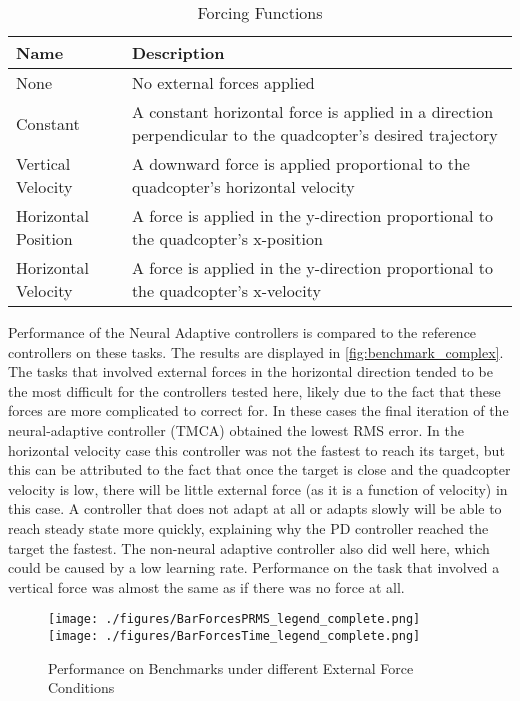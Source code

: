 \documentclass[letterpaper,12pt,titlepage,oneside,final]{book}
\begin{document}
\begin{table}
\caption{Forcing Functions} \label{table:forcingfunctions}
\begin{center}
\begin{tabular}{| l | p{9cm} |}
\hline
\textbf{Name} & \textbf{Description} \\ \hline
None & No external forces applied \\ \hline
Constant & A constant horizontal force is applied in a direction perpendicular to the quadcopter's desired trajectory\\ \hline
Vertical Velocity & A downward force is applied proportional to the quadcopter's horizontal velocity \\ \hline
Horizontal Position & A force is applied in the y-direction proportional to the quadcopter's x-position \\ \hline
Horizontal Velocity & A force is applied in the y-direction proportional to the quadcopter's x-velocity \\ \hline
\end{tabular}
\end{center}
\end{table}

Performance of the Neural Adaptive controllers is compared to the reference controllers on these tasks.
The results are displayed in \autoref{fig:benchmark_complex}.
The tasks that involved external forces in the horizontal direction tended to be the most difficult for the controllers tested here, likely due to the fact that these forces are more complicated to correct for.
In these cases the final iteration of the neural-adaptive controller (TMCA) obtained the lowest RMS error.
In the horizontal velocity case this controller was not the fastest to reach its target, but this can be attributed to the fact that once the target is close and the quadcopter velocity is low, there will be little external force (as it is a function of velocity) in this case. 
A controller that does not adapt at all or adapts slowly will be able to reach steady state more quickly, explaining why the PD controller reached the target the fastest.
The non-neural adaptive controller also did well here, which could be caused by a low learning rate.
Performance on the task that involved a vertical force was almost the same as if there was no force at all. 

\begin{figure}
\centering
\texttt{[image: ./figures/BarForcesPRMS\_legend\_complete.png]}
\texttt{[image: ./figures/BarForcesTime\_legend\_complete.png]}

\caption{Performance on Benchmarks under different External Force Conditions}
\label{fig:benchmark_complex}
\captionsetup{singlelinecheck=off,font=footnotesize}
\caption*{}
\end{figure}
\end{document}
